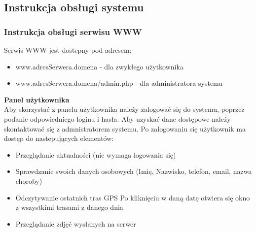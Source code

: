 \documentclass[11pt,a4paper]{article}
\begin{document}
\subsection{Instrukcja obsługi systemu}
\subsubsection{Instrukcja obsługi serwisu WWW}

Serwis WWW jest dostepny pod adresem:
\begin{itemize}
\item www.adresSerwera.domena - dla zwykłego użytkownika 
\item www.adresSerwera.domena/admin.php - dla administratora systemu
\end{itemize}

{\bf Panel użytkownika}\\
Aby skorzystać z panelu użytkownika należy zalogować się do systemu, poprzez podanie odpowiedniego loginu i hasła.
Aby uzyskać dane dostępowe należy skontaktować się z admnistratorem systemu.
Po zalogowaniu się użytkownik ma dostęp do nastepujących elementów:
\begin{itemize}
\item Przeglądanie aktualności (nie wymaga logowania się)
\item Sprawdzanie swoich danych osobowych (Imię, Nazwisko, telefon, email, nazwa choroby)
\item Odczytywanie ostatnich tras GPS 
\subitem Po kliknięciu w daną datę otwiera się okno z wszystkimi trasami z danego dnia
\item Przeglądanie zdjęć wysłanych na serwer
\end{itemize}
\end{document}

